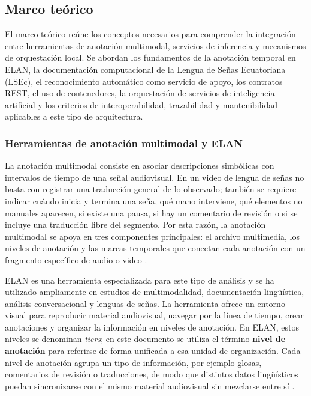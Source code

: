 \documentclass[11pt,a4paper]{article}
\begin{document}
\subsection{Marco teórico}

El marco teórico reúne los conceptos necesarios para comprender la integración entre herramientas de anotación multimodal, servicios de inferencia y mecanismos de orquestación local. Se abordan los fundamentos de la anotación temporal en ELAN, la documentación computacional de la Lengua de Señas Ecuatoriana (LSEc), el reconocimiento automático como servicio de apoyo, los contratos REST, el uso de contenedores, la orquestación de servicios de inteligencia artificial y los criterios de interoperabilidad, trazabilidad y mantenibilidad aplicables a este tipo de arquitectura.

\subsubsection{Herramientas de anotación multimodal y ELAN}

La anotación multimodal consiste en asociar descripciones simbólicas con intervalos de tiempo de una señal audiovisual. En un video de lengua de señas no basta con registrar una traducción general de lo observado; también se requiere indicar cuándo inicia y termina una seña, qué mano interviene, qué elementos no manuales aparecen, si existe una pausa, si hay un comentario de revisión o si se incluye una traducción libre del segmento. Por esta razón, la anotación multimodal se apoya en tres componentes principales: el archivo multimedia, los niveles de anotación y las marcas temporales que conectan cada anotación con un fragmento específico de audio o video \cite{wittenburg2006elan}.

ELAN es una herramienta especializada para este tipo de análisis y se ha utilizado ampliamente en estudios de multimodalidad, documentación lingüística, análisis conversacional y lenguas de señas. La herramienta ofrece un entorno visual para reproducir material audiovisual, navegar por la línea de tiempo, crear anotaciones y organizar la información en niveles de anotación. En ELAN, estos niveles se denominan \textit{tiers}; en este documento se utiliza el término \textbf{nivel de anotación} para referirse de forma unificada a esa unidad de organización. Cada nivel de anotación agrupa un tipo de información, por ejemplo glosas, comentarios de revisión o traducciones, de modo que distintos datos lingüísticos puedan sincronizarse con el mismo material audiovisual sin mezclarse entre sí \cite{wittenburg2006elan}.
\end{document}
